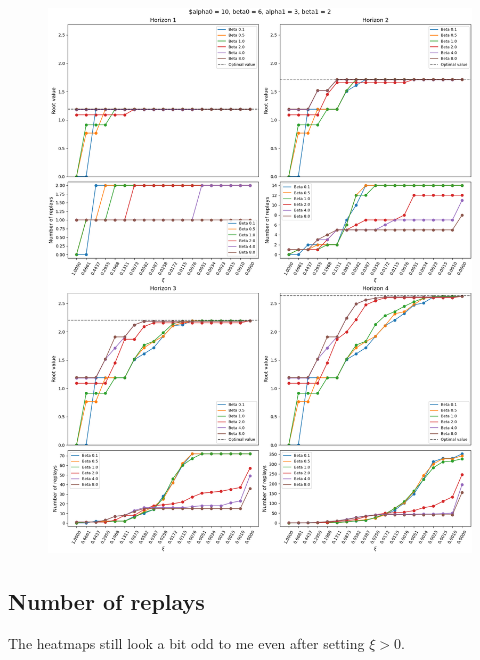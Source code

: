 \documentclass{article}
\begin{document}
\begin{figure}[ht!]
    \centering
    \includegraphics[width=1\textwidth]{../../../../bandit/data/convergence/xi/alpha010_beta06_alpha13_beta12_complete.png}
\end{figure}

\clearpage

\subsection*{Number of replays}

The heatmaps still look a bit odd to me even after setting $\xi > 0$.

\end{document}
